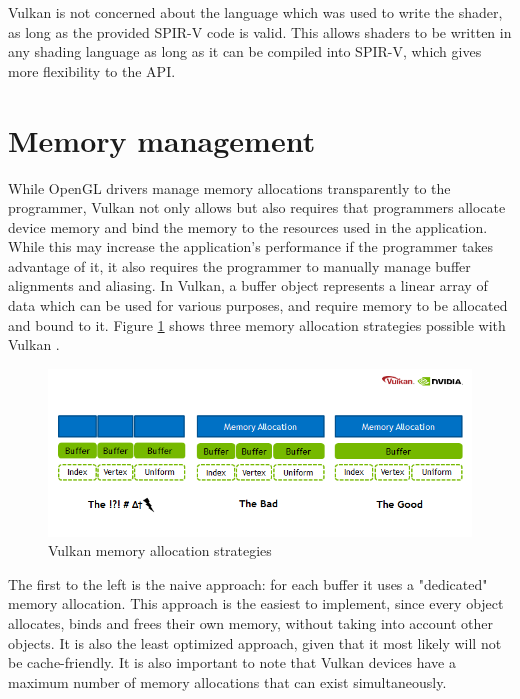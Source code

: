 Vulkan is not concerned about the language which was used to write the shader, as long as the provided SPIR-V code is valid. This allows shaders to be written in any shading language as long as it can be compiled into SPIR-V, which gives more flexibility to the API.

\section{Memory management}
While OpenGL drivers manage memory allocations transparently to the programmer, Vulkan not only allows but also requires that programmers allocate device memory and bind the memory to the resources used in the application. While this may increase the application's performance if the programmer takes advantage of it, it also requires the programmer to manually manage buffer alignments and aliasing. In Vulkan, a buffer object represents a linear array of data which can be used for various purposes, and require memory to be allocated and bound to it. Figure \ref{fig:vulkan_mem_alloc} shows three memory allocation strategies possible with Vulkan \cite{vulkan_mem_mgmt}.

\begin{figure}[ht]
    \caption{Vulkan memory allocation strategies}
    \begin{center}
        \includegraphics[width = 15cm]{figs/vulkan_memory_strategy.png}
    \end{center}
    \label{fig:vulkan_mem_alloc}
\end{figure}

The first to the left is the naive approach: for each buffer it uses a "dedicated" memory allocation. This approach is the easiest to implement, since every object allocates, binds and frees their own memory, without taking into account other objects. It is also the least optimized approach, given that it most likely will not be cache-friendly. It is also important to note that Vulkan devices have a maximum number of memory allocations that can exist simultaneously.

